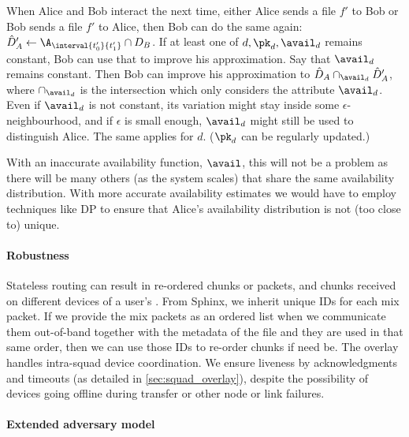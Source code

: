 When Alice and Bob interact the next time, either Alice sends a file \(f'\) to 
Bob or Bob sends a file \(f'\) to Alice, then Bob can do the same again:
\(\hat D_A' \gets \A_{\interval{t_0'}{t_1'}} \cap D_B\).
If at least one of \(d, \pk_d, \avail_d\) remains constant, Bob can use that to 
improve his approximation.
Say that \(\avail_d\) remains constant.
Then Bob can improve his approximation to \(\hat D_A \cap_{\avail_d} 
  \hat{D}_A'\), where \(\cap_{\avail_d}\) is the intersection which only 
considers the attribute \(\avail_d\).
Even if \(\avail_d\) is not constant, its variation might stay inside some 
\(\epsilon\)-neighbourhood, and if \(\epsilon\) is small enough, \(\avail_d\) 
might still be used to distinguish Alice.
The same applies for \(d\).
(\(\pk_d\) can be regularly updated.)

With an inaccurate availability function, \(\avail\), this will not be a 
problem as there will be many others (as the system scales) that share the 
same availability distribution.
With more accurate availability estimates we would have to employ techniques 
like \ac{DP} to ensure that Alice's availability distribution is not
(too close to)
unique.

\paragraph*{Robustness}

Stateless routing can result in re-ordered chunks or packets, and
chunks received on different devices of a user's \squad. From \ac{Sphinx},
we inherit unique IDs for each mix packet.
If we provide the mix packets as an ordered list when we communicate them 
out-of-band together with the metadata of the file and they are used in that 
same order, then we can use those IDs to re-order chunks if need be.
The \squad overlay handles intra-squad device 
coordination.
We ensure liveness by acknowledgments and timeouts (as detailed in 
\cref{sec:squad_overlay}), despite the possibility of \squad devices
going offline during transfer or other node or link failures.


\paragraph*{Extended adversary model}%
\label{security-limitations}

